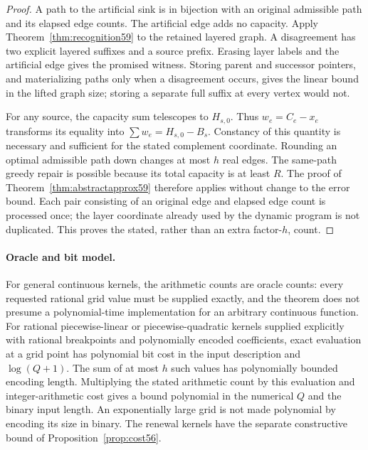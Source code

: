 \begin{proof}
A path to the artificial sink is in bijection with an original admissible path and its elapsed edge counts. The artificial edge adds no capacity. Apply Theorem~\ref{thm:recognition59} to the retained layered graph. A disagreement has two explicit layered suffixes and a source prefix. Erasing layer labels and the artificial edge gives the promised witness. Storing parent and successor pointers, and materializing paths only when a disagreement occurs, gives the linear bound in the lifted graph size; storing a separate full suffix at every vertex would not.

For any source, the capacity sum telescopes to $H_{s,0}$. Thus $w_e=C_e-x_e$ transforms its equality into $\sum w_e=H_{s,0}-B_s$. Constancy of this quantity is necessary and sufficient for the stated complement coordinate. Rounding an optimal admissible path down changes at most $h$ real edges. The same-path greedy repair is possible because its total capacity is at least $R$. The proof of Theorem~\ref{thm:abstractapprox59} therefore applies without change to the error bound. Each pair consisting of an original edge and elapsed edge count is processed once; the layer coordinate already used by the dynamic program is not duplicated. This proves the stated, rather than an extra factor-$h$, count.
\end{proof}

\paragraph{Oracle and bit model.} For general continuous kernels, the arithmetic counts are oracle counts: every requested rational grid value must be supplied exactly, and the theorem does not presume a polynomial-time implementation for an arbitrary continuous function. For rational piecewise-linear or piecewise-quadratic kernels supplied explicitly with rational breakpoints and polynomially encoded coefficients, exact evaluation at a grid point has polynomial bit cost in the input description and $\log(Q+1)$. The sum of at most $h$ such values has polynomially bounded encoding length. Multiplying the stated arithmetic count by this evaluation and integer-arithmetic cost gives a bound polynomial in the numerical $Q$ and the binary input length. An exponentially large grid is not made polynomial by encoding its size in binary. The renewal kernels have the separate constructive bound of Proposition~\ref{prop:cost56}.

